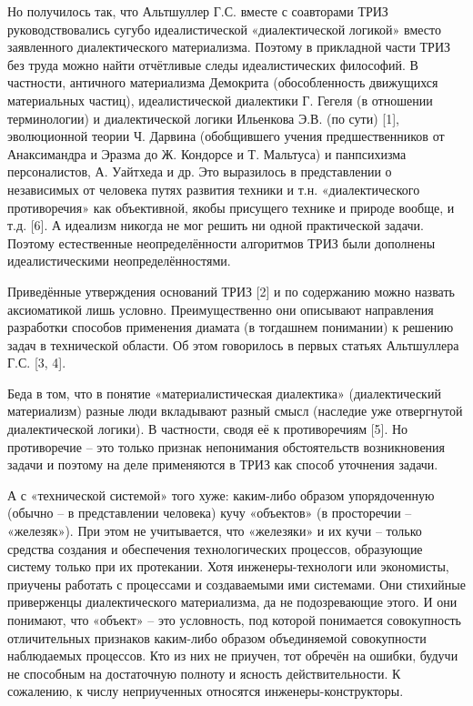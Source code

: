 \documentclass[11pt,a4paper]{article}
\begin{document}
Но получилось так, что Альтшуллер Г.С. вместе с соавторами ТРИЗ руководствовались сугубо идеалистической «диалектической логикой» вместо заявленного диалектического материализма. Поэтому в прикладной части ТРИЗ без труда можно найти отчётливые следы идеалистических философий. В частности, античного материализма Демокрита (обособленность движущихся материальных частиц), идеалистической диалектики Г. Гегеля (в отношении терминологии) и диалектической логики Ильенкова Э.В. (по сути) [1], эволюционной теории Ч. Дарвина (обобщившего учения предшественников от Анаксимандра и Эразма до Ж. Кондорсе и Т. Мальтуса) и панпсихизма персоналистов, А. Уайтхеда и др. Это выразилось в представлении о независимых от человека путях развития техники и т.н. «диалектического противоречия» как объективной, якобы присущего технике и природе вообще, и т.д. [6]. А идеализм никогда не мог решить ни одной практической задачи. Поэтому естественные неопределённости алгоритмов ТРИЗ были дополнены идеалистическими неопределённостями.

Приведённые утверждения оснований ТРИЗ [2] и по содержанию можно назвать аксиоматикой лишь условно. Преимущественно они описывают направления разработки способов применения диамата (в тогдашнем понимании) к решению задач в технической области. Об этом говорилось в первых статьях Альтшуллера Г.С. [3, 4].

Беда в том, что в понятие «материалистическая диалектика» (диалектический материализм) разные люди вкладывают разный смысл (наследие уже отвергнутой диалектической логики). В частности, сводя её к противоречиям [5]. Но противоречие – это только признак непонимания обстоятельств возникновения задачи и поэтому на деле применяются в ТРИЗ как способ уточнения задачи.

А с «технической системой» того хуже: каким-либо образом упорядоченную (обычно – в представлении человека) кучу «объектов» (в просторечии – «железяк»). При этом не учитывается, что «железяки» и их кучи – только средства создания и обеспечения технологических процессов, образующие систему только при их протекании. Хотя инженеры-технологи или экономисты, приучены работать с процессами и создаваемыми ими системами. Они стихийные приверженцы диалектического материализма, да не подозревающие этого. И они понимают, что «объект» – это условность, под которой понимается совокупность отличительных признаков каким-либо образом объединяемой совокупности наблюдаемых процессов. Кто из них не приучен, тот обречён на ошибки, будучи не способным на достаточную полноту и ясность действительности. К сожалению, к числу неприученных относятся инженеры-конструкторы.
\end{document}
